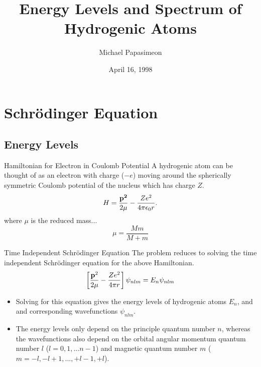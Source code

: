 \documentclass[aspectratio=1610,xcolor=dvipsnames,t]{beamer}
\title[Hydrogenic Atoms]{Energy Levels and Spectrum of Hydrogenic Atoms}
\author{ Michael Papasimeon}
\date{April 16, 1998}
\begin{document}
\begin{frame}
    \titlepage
\end{frame} 

\section{Schr\"odinger Equation}

    \subsection{Energy Levels}
    \begin{frame}{Hamiltonian for Electron in Coulomb Potential} 
        A hydrogenic atom can be thought of as an electron with charge ($-e$)
        moving around the spherically symmetric Coulomb potential of the
        nucleus which has charge $Z$. 
        \begin{equation} 
            H = \frac{\bf{p}^2}{2\mu} - \frac{Ze^2}{4 \pi \epsilon_0 r}.
        \end{equation} 
        where $\mu$ is the reduced mass...
        \begin{equation}
            \mu = \frac{Mm}{M + m}
        \end{equation}
    \end{frame} 

    \begin{frame}{Time Independent Schr\"odinger Equation} 
    The problem reduces to solving the time independent Schr\"odinger equation
    for the above Hamiltonian.
    \begin{equation}
    \left[ \frac{{\bf p}^2}{2\mu} - \frac{Ze^2}{4 \pi r}\right] \psi_{nlm} = E_n \psi_{nlm} 
    \end{equation}
    
    \begin{itemize} 
        \item Solving for this equation gives the energy levels of hydrogenic atoms $E_n$, and 
              and corresponding wavefunctions $\psi_{nlm}$. 
        \item The energy levels only depend on the
              principle quantum number $n$, whereas the wavefunctions also depend on the 
              orbital angular momentum quantum number $l$ ($l = 0, 1, ... n - 1$) and 
              magnetic quantum number $m$ ($m = -l, -l + 1, ... , +l - 1, +l$).
    \end{itemize} 
    \end{frame} 
\end{document}
